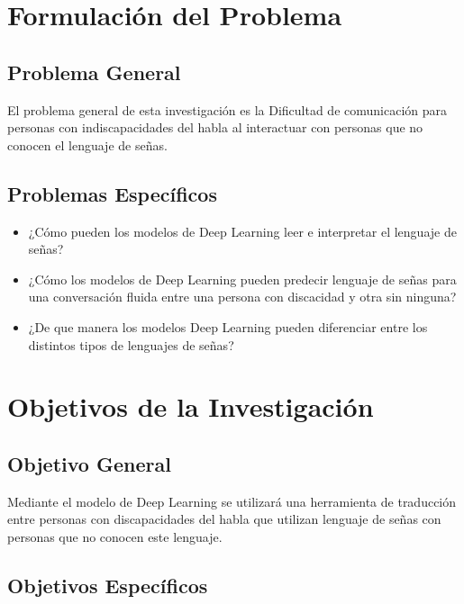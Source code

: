 \section{Formulación del Problema}


\subsection{Problema General}
\newcommand{\ProblemaGeneral}{
	El problema general de esta investigación es la Dificultad de comunicación para personas con indiscapacidades del habla al interactuar con personas que no conocen el lenguaje de señas.
}
\ProblemaGeneral
\subsection{Problemas Espec\'{i}ficos}
\newcommand{\Pbone}{
¿Cómo pueden los modelos de Deep Learning leer e interpretar el lenguaje de señas?
}
\newcommand{\Pbtwo}{
¿Cómo los modelos de Deep Learning pueden predecir lenguaje de señas para una conversación fluida entre una persona con discacidad y otra sin ninguna?
}
\newcommand{\Pbthree}{
¿De que manera los modelos Deep Learning pueden  diferenciar entre los distintos tipos de lenguajes de señas?
}

\begin{itemize}
	\item \Pbone
	\item \Pbtwo
	\item \Pbthree
\end{itemize}

\section{Objetivos de la Investigación}
\subsection{Objetivo General}
\newcommand{\ObjetivoGeneral}{
Mediante el modelo de Deep Learning se utilizará una herramienta de traducción entre personas con discapacidades del habla que utilizan lenguaje de señas con personas que no conocen este lenguaje. 
}
\ObjetivoGeneral
\subsection{Objetivos Espec\'{i}ficos}
\newcommand{\Objone}{
Traducir lenguajes de señas utilizando técnicas de visión de computadora y el uso de Redes Neuronales.
}
\newcommand{\Objtwo}{
El modelo puede ser entrenado utilizando conjuntos extensos de datos para mejorar su exactitud y capacidad de interpretación de gestos. Esto facilita una comunicación más natural y sin interrupciones entre individuos con y sin discapacidad auditiva.
}
\newcommand{\Objthree}{
Los modelos de Deep Learning pueden entrenarse con conjuntos de datos etiquetados que contienen ejemplos de diferentes lenguajes de señas. Esto les permite aprender a asociar patrones visuales específicos con cada lenguaje de señas.
}

